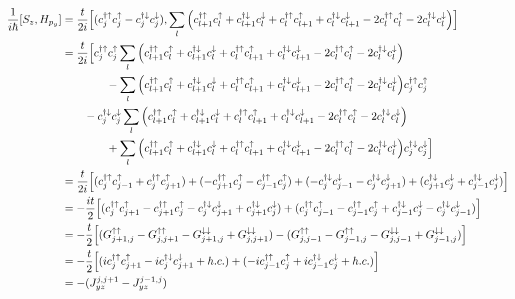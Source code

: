 \documentclass[10pt,prb,showpacs,amssymb,floatfix]{revtex4-1}
\newcommand{\dg}{\dagger}
\newcommand{\dna}{\downarrow}
\newcommand{\dn}{\downarrow}
\newcommand{\nn}{\nonumber}
\newcommand{\upa}{\uparrow}
\begin{document}
\begin{align}
\frac{1}{i\hbar}[S_z,H_{p_y}] &= \frac{t}{2i}\Big{[} (c_{j}^{\dg\upa} c_{j}^{\upa} - c_{j}^{\dg\dna} c_{j}^{\dna}) ,   \sum_{l}  \Big{(} c_{l+1}^{\dagger \upa} c_{l}^\upa + c_{l+1}^{\dagger \dn} c_{l}^\dn  +c_{l}^{\dagger \upa} c_{l+1}^\upa + c_{l}^{\dagger \dn} c_{l+1}^\dn  - 2 c_{l}^{\dagger \upa} c_{l}^\upa   - 2 c_{l}^{\dagger \dn} c_{l}^\dn  \Big{)} \Big{]} \\
&=  \frac{t}{2i} \Big{[}c_{j}^{\dg\upa} c_{j}^{\upa}  \sum_{l}  \Big{(} c_{l+1}^{\dagger \upa} c_{l}^\upa + c_{l+1}^{\dagger \dn} c_{l}^\dn  +c_{l}^{\dagger \upa} c_{l+1}^\upa + c_{l}^{\dagger \dn} c_{l+1}^\dn  - 2 c_{l}^{\dagger \upa} c_{l}^\upa   - 2 c_{l}^{\dagger \dn} c_{l}^\dn  \Big{)} \nn\\
&~~~~~~~~~~~~ -  \sum_{l}  \Big{(} c_{l+1}^{\dagger \upa} c_{l}^\upa + c_{l+1}^{\dagger \dn} c_{l}^\dn  +c_{l}^{\dagger \upa} c_{l+1}^\upa + c_{l}^{\dagger \dn} c_{l+1}^\dn  - 2 c_{l}^{\dagger \upa} c_{l}^\upa   - 2 c_{l}^{\dagger \dn} c_{l}^\dn  \Big{)} c_{j}^{\dg\upa} c_{j}^{\upa} \nn\\
 &~~~~~~ - c_{j}^{\dg\dna} c_{j}^{\dna}  \sum_{l}  \Big{(} c_{l+1}^{\dagger \upa} c_{l}^\upa + c_{l+1}^{\dagger \dn} c_{l}^\dn  +c_{l}^{\dagger \upa} c_{l+1}^\upa + c_{l}^{\dagger \dn} c_{l+1}^\dn  - 2 c_{l}^{\dagger \upa} c_{l}^\upa   - 2 c_{l}^{\dagger \dn} c_{l}^\dn  \Big{)} \nn\\
 &~~~~~~~~~~~~ +  \sum_{l}  \Big{(} c_{l+1}^{\dagger \upa} c_{l}^\upa + c_{l+1}^{\dagger \dn} c_{l}^\dn  +c_{l}^{\dagger \upa} c_{l+1}^\upa + c_{l}^{\dagger \dn} c_{l+1}^\dn  - 2 c_{l}^{\dagger \upa} c_{l}^\upa   - 2 c_{l}^{\dagger \dn} c_{l}^\dn  \Big{)}  c_{j}^{\dg\dna} c_{j}^{\dna} \Big{]} \nn\\
 & =  \frac{t}{2i} \Big{[}(c_{j}^{\dg\upa} c_{j-1}^{\upa}  + c_{j}^{\dg\upa} c_{j+1}^{\upa}) + ( - c_{j+1}^{\dg\upa} c_{j}^{\upa} - c_{j-1}^{\dg\upa} c_{j}^{\upa}   ) + ( - c_{j}^{\dg\dna} c_{j-1}^{\dna} - c_{j}^{\dg\dna} c_{j+1}^{\dna}   )  + ( c_{j+1}^{\dg\dna} c_{j}^{\dna} +  c_{j-1}^{\dg\dna} c_{j}^{\dna}   ) \Big{]} \nn\\
 & = -\frac{it}{2} \Big{[}(   c_{j}^{\dg\upa} c_{j+1}^{\upa} - c_{j+1}^{\dg\upa} c_{j}^{\upa}  - c_{j}^{\dg\dna} c_{j+1}^{\dna}  +  c_{j+1}^{\dg\dna} c_{j}^{\dna} ) + (   c_{j}^{\dg\upa} c_{j-1}^{\upa} - c_{j-1}^{\dg\upa} c_{j}^{\upa}  + c_{j-1}^{\dg\dna} c_{j}^{\dna}  - c_{j}^{\dg\dna} c_{j-1}^{\dna} ) \Big{]} \nn\\
 &= -\frac{t}{2} \Big{[}(   G_{j+1,j}^{\upa \upa} - G_{j,j+1}^{\upa\upa}  - G_{j+1,j}^{\dna\dna}   +  G_{j,j+1}^{\dna\dna}  ) - (    G_{j,j-1}^{\upa \upa}  -G_{j-1,j}^{\upa\upa}    - G_{j,j-1}^{\dna\dna}  + G_{j-1,j}^{\dna\dna}  ) \Big{]} \nn\\
 &=  -\frac{t}{2} \Big{[}(   ic_{j}^{\dg\upa} c_{j+1}^{\upa}   - ic_{j}^{\dg\dna} c_{j+1}^{\dna}  + h.c. ) + (    - ic_{j-1}^{\dg\upa} c_{j}^{\upa}  + ic_{j-1}^{\dg\dna} c_{j}^{\dna}  + h.c. ) \Big{]} \nn\\
 &= -  (J^{j,j+1}_{yz} - J^{j-1,j}_{yz})
\end{align}
\end{document}
